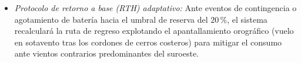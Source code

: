 \documentclass[letterpaper,12pt]{article}
\begin{document}
\begin{enumerate}
\begin{itemize}
\begin{itemize}
            \item Celdas meteorológicas de Open-Meteo \cite{openmeteo} con ráfagas de viento superiores a $12{,}0\text{ m/s}$ a $120\text{ m}$ AGL (límite estructural y de control de actitud del DJI Matrice 350 RTK \cite{dji}) o condiciones de niebla costera densa (visibilidad $<1.000\text{ m}$ o $\text{HR} \ge 95$\,\% con nubes bajas $\ge 80$\,\%, violando los mínimos de vuelo visual VMC).
        \end{itemize}
        \item \textit{Protocolo de retorno a base (RTH) adaptativo:} Ante eventos de contingencia o agotamiento de batería hacia el umbral de reserva del $20$\,\%, el sistema recalculará la ruta de regreso explotando el apantallamiento orográfico (vuelo en sotavento tras los cordones de cerros costeros) para mitigar el consumo ante vientos contrarios predominantes del suroeste.
    \end{itemize}
\end{enumerate}

\newpage
\end{document}
